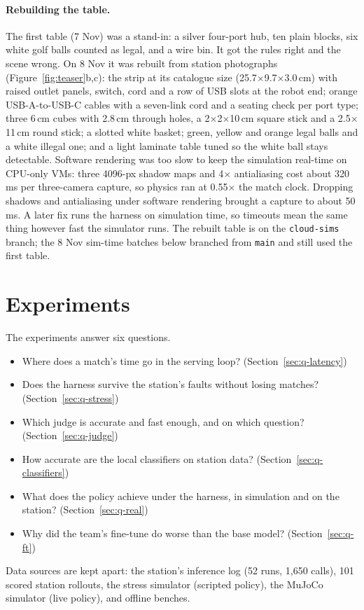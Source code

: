 \documentclass[10pt]{article}
\newcommand{\q}[1]{\textbf{Q#1}}
\begin{document}
\paragraph{Rebuilding the table.} The first table (7 Nov) was a stand-in: a silver four-port hub, ten plain blocks, six white golf
balls counted as legal, and a wire bin. It got the rules right and the scene wrong. On 8 Nov it was rebuilt from station photographs
(Figure~\ref{fig:teaser}b,c): the strip at its catalogue size (25.7$\times$9.7$\times$3.0\,cm) with raised outlet panels, switch, cord
and a row of USB slots at the robot end; orange USB-A-to-USB-C cables with a seven-link cord and a seating check per port type; three
6\,cm cubes with 2.8\,cm through holes, a 2$\times$2$\times$10\,cm square stick and a 2.5$\times$11\,cm round stick; a slotted white
basket; green, yellow and orange legal balls and a white illegal one; and a light laminate table tuned so the white ball stays
detectable. Software rendering was too slow to keep the simulation real-time on CPU-only VMs: three 4096-px shadow maps and 4$\times$
antialiasing cost about 320\,ms per three-camera capture, so physics ran at 0.55$\times$ the match clock. Dropping shadows and
antialiasing under software rendering brought a capture to about 50\,ms. A later fix runs the harness on simulation time, so timeouts
mean the same thing however fast the simulator runs. The rebuilt table is on the \texttt{cloud-sims} branch; the 8 Nov sim-time
batches below branched from \texttt{main} and still used the first table.

\section{Experiments}
\label{sec:experiments}

The experiments answer six questions.
\begin{itemize}
  \item[\q1] Where does a match's time go in the serving loop? (Section~\ref{sec:q-latency})
  \item[\q2] Does the harness survive the station's faults without losing matches? (Section~\ref{sec:q-stress})
  \item[\q3] Which judge is accurate and fast enough, and on which question? (Section~\ref{sec:q-judge})
  \item[\q4] How accurate are the local classifiers on station data? (Section~\ref{sec:q-classifiers})
  \item[\q5] What does the policy achieve under the harness, in simulation and on the station? (Section~\ref{sec:q-real})
  \item[\q6] Why did the team's fine-tune do worse than the base model? (Section~\ref{sec:q-ft})
\end{itemize}
Data sources are kept apart: the station's inference log (52 runs, 1{,}650 calls), 101 scored station rollouts, the stress
simulator (scripted policy), the MuJoCo simulator (live policy), and offline benches.
\end{document}
